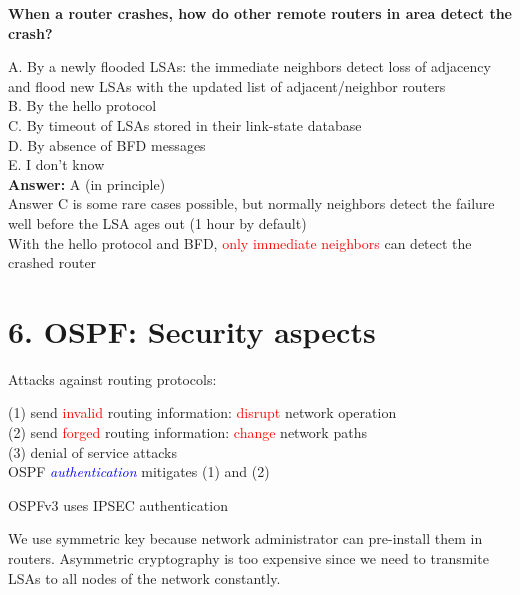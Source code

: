 \documentclass[11pt]{article}
\begin{document}
\begin{tcolorbox}[
  colback=gray!15,     %
  colframe=black!50,    %
  boxrule=1pt,       %
  arc=3mm,             %
  left=4mm, right=4mm, top=2mm, bottom=2mm %
]
\textbf{When a router crashes, how do other \textbf{remote} routers in area detect the crash?}

\vspace{0.3cm}

A. By a newly flooded LSAs: the immediate neighbors detect loss of adjacency and flood new LSAs with the updated list of adjacent/neighbor routers \\
B. By the hello protocol \\
C. By timeout of LSAs stored in their link-state database \\
D. By absence of BFD messages \\
E. I don't know \\

\textbf{Answer:} A (in principle) \\
Answer C is some rare cases possible, but normally neighbors detect the failure well before the LSA ages out (1 hour by default) \\

With the hello protocol and BFD, \textcolor{red}{only immediate neighbors} can detect the crashed router
\end{tcolorbox}

\section*{6. OSPF: Security aspects}

Attacks against routing protocols:

(1) send \textcolor{red}{invalid} routing information: \textcolor{red}{disrupt} network operation \\
(2) send \textcolor{red}{forged} routing information: \textcolor{red}{change} network paths \\
(3) denial of service attacks \\

OSPF \textcolor{blue}{\textit{authentication}} mitigates (1) and (2)

OSPFv3 uses IPSEC authentication

We use symmetric key because network administrator can pre-install them in routers. Asymmetric cryptography is too expensive since we need to transmite LSAs to all nodes of the network constantly. 
\end{document}
